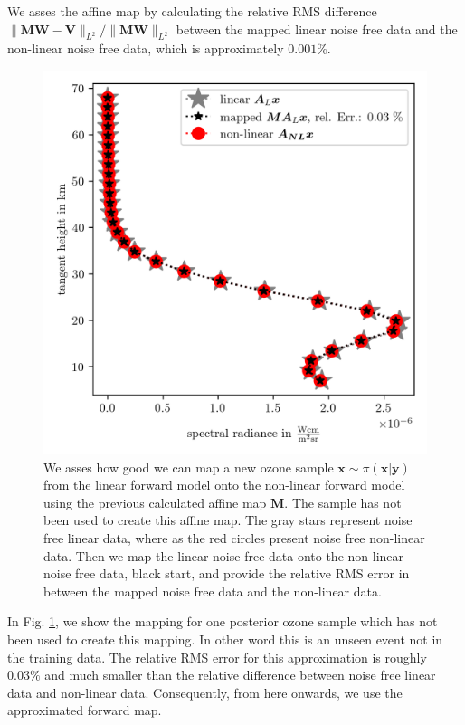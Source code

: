We asses the affine map by calculating the relative RMS difference $\lVert \bm{M}\bm{W} - \bm{V}  \rVert_{L^2} / \lVert \bm{M}\bm{W} \rVert_{L^2} $ between the mapped linear noise free data and the non-linear noise free data, which is approximately $0.001\%$.
\begin{figure}[ht!]
	\centering
	\includegraphics{SampMapAssesmentTT.png}
	\caption[Assessment of affine map.]{We asses how good we can map a new ozone sample $\bm{x} \sim \pi(\bm{x}|\bm{y})$ from the linear forward model onto the non-linear forward model using the previous calculated affine map $\bm{M}$. The sample has not been used to create this affine map. The gray stars represent noise free linear data, where as the red circles present noise free non-linear data. Then we map the linear noise free data onto the non-linear noise free data, black start, and provide the relative RMS error in between the mapped noise free data and the non-linear data.}
	\label{fig:MapAsses}
\end{figure}
In Fig. \ref{fig:MapAsses}, we show the mapping for one posterior ozone sample which has not been used to create this mapping.
In other word this is an unseen event not in the training data.
The relative RMS error for this approximation is roughly $0.03\%$ and much smaller than the relative difference between noise free linear data and non-linear data.
Consequently, from here onwards, we use the approximated forward map.

